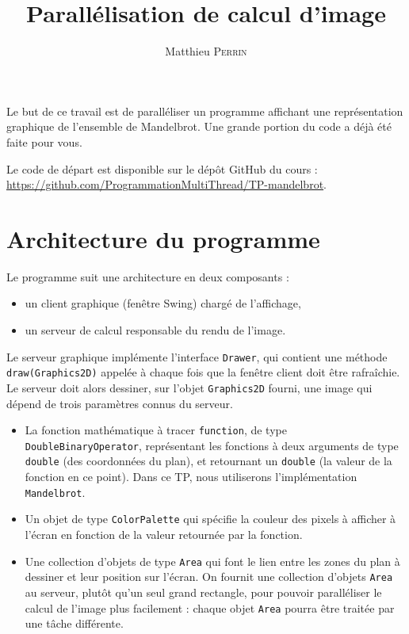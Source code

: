 \documentclass{td}
\author{Matthieu \textsc{Perrin}}
\title{Parallélisation de calcul d'image}
\begin{document}
\maketitle

Le but de ce travail est de paralléliser un programme affichant une représentation
graphique de l'ensemble de Mandelbrot. Une grande portion du code a déjà été faite pour vous.

Le code de départ est disponible sur le dépôt GitHub du cours :
\url{https://github.com/ProgrammationMultiThread/TP-mandelbrot}.

\section{Architecture du programme}

Le programme suit une architecture en deux composants :
\begin{itemize}
\item un client graphique (fenêtre Swing) chargé de l'affichage,
\item un serveur de calcul responsable du rendu de l'image.
\end{itemize}

Le serveur graphique implémente l'interface \lstinline{Drawer}, qui contient une méthode
\lstinline{draw(Graphics2D)} appelée à chaque fois que la fenêtre client doit être rafraîchie.
Le serveur doit alors dessiner, sur l'objet \lstinline{Graphics2D} fourni, une image
qui dépend de trois paramètres connus du serveur.
\begin{itemize}
\item La fonction mathématique à tracer \lstinline{function}, de type \lstinline{DoubleBinaryOperator},
  représentant les fonctions à deux arguments de type \lstinline{double} (des coordonnées du plan),
  et retournant un \lstinline{double} (la valeur de la fonction en ce point).
  Dans ce TP, nous utiliserons l'implémentation \lstinline{Mandelbrot}.
\item Un objet de type \lstinline{ColorPalette} qui spécifie la couleur des pixels à afficher à l'écran
  en fonction de la valeur retournée par la fonction.
\item Une collection d'objets de type \lstinline{Area} qui font le lien entre les zones du plan à dessiner
  et leur position sur l'écran. On fournit une collection d'objets \lstinline{Area} au serveur,
  plutôt qu'un seul grand rectangle, pour pouvoir paralléliser le calcul de l'image plus facilement :
  chaque objet \lstinline{Area} pourra être traitée par une tâche différente.
\end{itemize}
\end{document}
